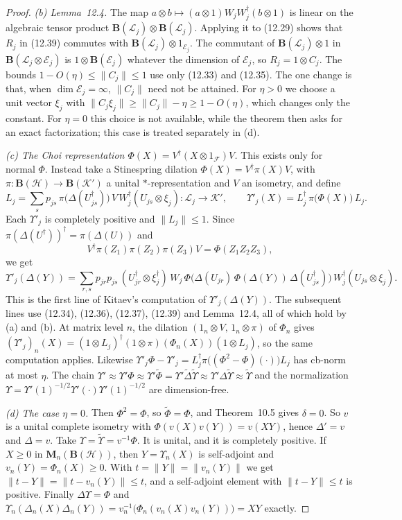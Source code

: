 \documentclass[11pt]{article}
\theoremstyle{remark}
\newcommand{\cH}{\mathcal{H}}
\newcommand{\cK}{\mathcal{K}}
\newcommand{\cL}{\mathcal{L}}
\newcommand{\cE}{\mathcal{E}}
\newcommand{\Bo}{\mathbf{B}}
\newcommand{\wt}{\widetilde}
\newcommand{\Ma}[1]{\mathbf{M}_{#1}}
\begin{document}
\begin{proof}
\emph{(b) Lemma~12.4.} The map $a\otimes b\mapsto(a\otimes1)W_jW_j^\dagger(b\otimes1)$ is linear on the algebraic tensor product $\Bo(\cL_j)\otimes\Bo(\cL_j)$. Applying it to (12.29) shows that $R_j$ in (12.39) commutes with $\Bo(\cL_j)\otimes1_{\cE_j}$. The commutant of $\Bo(\cL_j)\otimes1$ in $\Bo(\cL_j\otimes\cE_j)$ is $1\otimes\Bo(\cE_j)$ whatever the dimension of $\cE_j$, so $R_j=1\otimes C_j$. The bounds $1-O(\eta)\le\|C_j\|\le1$ use only (12.33) and (12.35). The one change is that, when $\dim\cE_j=\infty$, $\|C_j\|$ need not be attained. For $\eta>0$ we choose a unit vector $\xi_j$ with $\|C_j\xi_j\|\ge\|C_j\|-\eta\ge1-O(\eta)$, which changes only the constant. For $\eta=0$ this choice is not available, while the theorem then asks for an exact factorization; this case is treated separately in (d).

\emph{(c) The Choi representation $\Phi(X)=V^\dagger(X\otimes1_\mathcal{F})V$.} This exists only for normal $\Phi$. Instead take a Stinespring dilation $\Phi(X)=V^\dagger\pi(X)V$, with $\pi\colon\Bo(\cH)\to\Bo(\cK')$ a unital $*$-representation and $V$ an isometry, and define
\[
L_j=\sum_sp_{js}\,\pi\bigl(\Delta(U_{js}^\dagger)\bigr)\,V\,W_j^\dagger(U_{js}\otimes\xi_j)\colon\cL_j\to\cK',\qquad
\Upsilon'_j(X)=L_j^\dagger\,\pi\bigl(\Phi(X)\bigr)\,L_j .
\]
Each $\Upsilon'_j$ is completely positive and $\|L_j\|\le1$. Since $\pi(\Delta(U^\dagger))^\dagger=\pi(\Delta(U))$ and
\[
V^\dagger\pi(Z_1)\pi(Z_2)\pi(Z_3)V=\Phi(Z_1Z_2Z_3),
\]
we get
\[
\Upsilon'_j(\Delta(Y))=\sum_{r,s}p_{jr}p_{js}\,(U_{jr}^\dagger\otimes\xi_j^\dagger)\,W_j\,
\Phi\bigl(\Delta(U_{jr})\,\Phi(\Delta(Y))\,\Delta(U_{js}^\dagger)\bigr)\,W_j^\dagger(U_{js}\otimes\xi_j).
\]
This is the first line of Kitaev's computation of $\Upsilon'_j(\Delta(Y))$. The subsequent lines use (12.34), (12.36), (12.37), (12.39) and Lemma~12.4, all of which hold by (a) and (b). At matrix level $n$, the dilation $(1_n\otimes V,\,1_n\otimes\pi)$ of $\Phi_n$ gives $(\Upsilon'_j)_n(X)=(1\otimes L_j)^\dagger(1\otimes\pi)(\Phi_n(X))(1\otimes L_j)$, so the same computation applies. Likewise $\Upsilon'_j\Phi-\Upsilon'_j=L_j^\dagger\pi\bigl((\Phi^2-\Phi)(\cdot)\bigr)L_j$ has cb-norm at most $\eta$. The chain $\Upsilon'\approx\Upsilon'\Phi\approx\Upsilon'\wt\Phi=\Upsilon'\wt\Delta\wt\Upsilon\approx\Upsilon'\Delta\wt\Upsilon\approx\wt\Upsilon$ and the normalization $\Upsilon=\Upsilon'(1)^{-1/2}\Upsilon'(\cdot)\Upsilon'(1)^{-1/2}$ are dimension-free.

\emph{(d) The case $\eta=0$.} Then $\Phi^2=\Phi$, so $\wt\Phi=\Phi$, and Theorem~10.5 gives $\delta=0$. So $v$ is a unital complete isometry with $\Phi(v(X)v(Y))=v(XY)$, hence $\Delta'=v$ and $\Delta=v$. Take $\Upsilon=\wt\Upsilon=v^{-1}\Phi$. It is unital, and it is completely positive. If $X\ge0$ in $\Ma{n}(\Bo(\cH))$, then $Y=\Upsilon_n(X)$ is self-adjoint and $v_n(Y)=\Phi_n(X)\ge0$. With $t=\|Y\|=\|v_n(Y)\|$ we get $\|t-Y\|=\|t-v_n(Y)\|\le t$, and a self-adjoint element with $\|t-Y\|\le t$ is positive. Finally $\Delta\Upsilon=\Phi$ and $\Upsilon_n(\Delta_n(X)\Delta_n(Y))=v_n^{-1}\bigl(\Phi_n(v_n(X)v_n(Y))\bigr)=XY$ exactly.
\end{proof}
\end{document}
